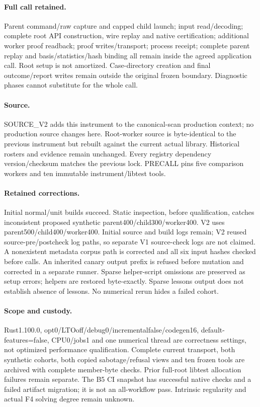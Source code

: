 \documentclass[10pt,a4paper]{article}
\begin{document}
\paragraph{Full call retained.} Parent command/raw capture and capped child launch; input read/decoding; complete root API construction, wire replay and native certification; additional worker proof readback; proof writes/transport; process receipt; complete parent replay and basis/statistics/hash binding all remain inside the agreed application call. Root setup is not amortized. Case-directory creation and final outcome/report writes remain outside the original frozen boundary. Diagnostic phases cannot substitute for the whole call.
\paragraph{Source.} SOURCE\_V2 adds this instrument to the canonical-scan production context; no production source changes here. Root-worker source is byte-identical to the previous instrument but rebuilt against the current actual library. Historical rosters and evidence remain unchanged. Every registry dependency version/checksum matches the previous lock. PRECALL pins five comparison workers and ten immutable instrument/libtest tools.
\paragraph{Retained corrections.} Initial normal/unit builds succeed. Static inspection, before qualification, catches inconsistent proposed synthetic parent400/child300/worker400. V2 uses parent500/child400/worker400. Initial source and build logs remain; V2 reused source-pre/postcheck log paths, so separate V1 source-check logs are not claimed. A nonexistent metadata corpus path is corrected and all six input hashes checked before calls. An inherited canary output prefix is refused before mutation and corrected in a separate runner. Sparse helper-script omissions are preserved as setup errors; helpers are restored byte-exactly. Sparse lessons output does not establish absence of lessons. No numerical rerun hides a failed cohort.
\paragraph{Scope and custody.} Rust1.100.0, opt0/LTOoff/debug0/incrementalfalse/codegen16, default-features=false, CPU0/jobs1 and one numerical thread are correctness settings, not optimized performance qualification. Complete current transport, both synthetic cohorts, both copied sabotage/refusal views and ten frozen tools are archived with complete member-byte checks. Prior full-root libtest allocation failures remain separate. The B5 CI snapshot has successful native checks and a failed artifact migration; it is not an all-workflow pass. Intrinsic regularity and actual F4 solving degree remain unknown.
\end{document}
